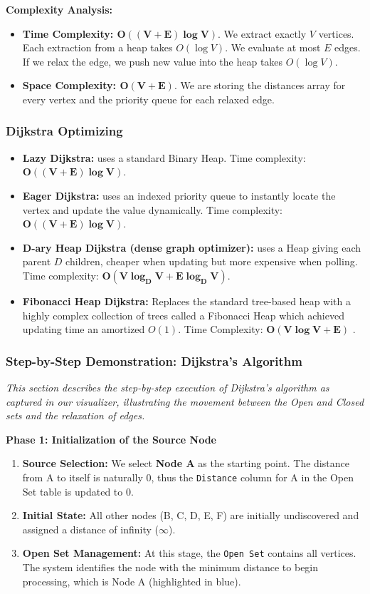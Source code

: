 \textbf{Complexity Analysis:}
\begin{itemize}
    \item \textbf{Time Complexity: $\mathbf{O((V+E)\log V)}$}. We extract exactly $V$ vertices. Each extraction from a heap takes $O(\log V)$. We evaluate at most $E$ edges. If we relax the edge, we push new value into the heap takes $O(\log V)$.
    \item \textbf{Space Complexity: $\mathbf{O(V + E)}$}. We are storing the distances array for every vertex and the priority queue for each relaxed edge.
\end{itemize}

\subsubsection{Dijkstra Optimizing}
\begin{itemize}
    \item \textbf{Lazy Dijkstra:} uses a standard Binary Heap. Time complexity: $\mathbf{O((V + E)\log V)}$.
    \item \textbf{Eager Dijkstra:} uses an indexed priority queue to instantly locate the vertex and update the value dynamically. Time complexity: $\mathbf{O((V + E)\log V)}$.
    \item \textbf{D-ary Heap Dijkstra (dense graph optimizer):} uses a Heap giving each parent $D$ children, cheaper when updating but more expensive when polling. \\ Time complexity: $\mathbf{O(V \log_D V + E \log_D V)}$.
    \item \textbf{Fibonacci Heap Dijkstra:} Replaces the standard tree-based heap with a highly complex collection of trees called a Fibonacci Heap which achieved updating time an amortized $O(1)$. Time Complexity: $\mathbf{O(V \log V + E)}$ \cite{fredman1987fibonacci}.
\end{itemize}
\subsubsection{Step-by-Step Demonstration: Dijkstra's Algorithm}
\textit{This section describes the step-by-step execution of Dijkstra's algorithm as captured in our visualizer, illustrating the movement between the Open and Closed sets and the relaxation of edges.}

\vspace{0.2cm}
\textbf{Phase 1: Initialization of the Source Node}
\begin{enumerate}
    \item \textbf{Source Selection:} We select \textbf{Node A} as the starting point. The distance from A to itself is naturally $0$, thus the \texttt{Distance} column for A in the Open Set table is updated to $0$.
    \item \textbf{Initial State:} All other nodes (B, C, D, E, F) are initially undiscovered and assigned a distance of infinity ($\infty$). 
    \item \textbf{Open Set Management:} At this stage, the \texttt{Open Set} contains all vertices. The system identifies the node with the minimum distance to begin processing, which is Node A (highlighted in blue).
\end{enumerate}

